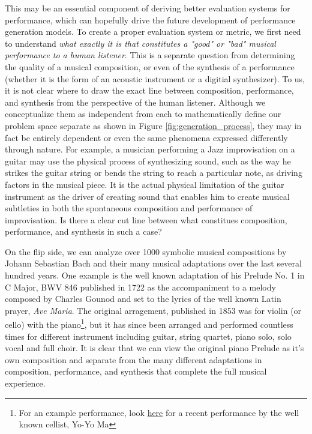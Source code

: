 This may be an essential component of deriving better evaluation systems for performance, which can hopefully drive the future development of performance generation models. To create a proper evaluation system or metric, we first need to understand \emph{what exactly it is that constitutes a "good" or "bad" musical performance to a human listener}. This is a separate question from determining the quality of a musical composition, or even of the synthesis of a performance (whether it is the form of an acoustic instrument or a digitial synthesizer). To us, it is not clear where to draw the exact line between composition, performance, and synthesis from the perspective of the human listener. Although we conceptualize them as independent from each to mathematically define our problem space separate as shown in Figure \ref{fig:generation_process}, they may in fact be entirely dependent or even the same phenomena expressed differently through nature. For example, a musician performing a Jazz improvisation on a guitar may use the physical process of synthesizing sound, such as the way he strikes the guitar string or bends the string to reach a particular note, as driving factors in the musical piece. It is the actual physical limitation of the guitar instrument as the driver of creating sound that enables him to create musical subtleties in both the spontaneous composition and performance of improvisation. Is there a clear cut line between what constitues composition, performance, and synthesis in such a case?

On the flip side, we can analyze over 1000 symbolic musical compositions by Johann Sebastian Bach and their many musical adaptations over the last several hundred years. One example is the well known adaptation of his Prelude No. 1 in C Major, BWV 846 published in 1722 as the accompaniment to a melody composed by Charles Gounod and set to the lyrics of the well known Latin prayer, \emph{Ave Maria}. The original arragement, published in 1853 was for violin (or cello) with the piano\footnote{For an example performance, look \href{https://www.youtube.com/watch?v=hyUhEjtlDLA&ab_channel=YoYoMaVEVO}{here} for a recent performance by the well known cellist, Yo-Yo Ma}, but it has since been arranged and performed countless times for different instrument including guitar, string quartet, piano solo, solo vocal and full choir. It is clear that we can view the original piano Prelude as it's own composition and separate from the many different adaptations in composition, performance, and synthesis that complete the full musical experience. 

